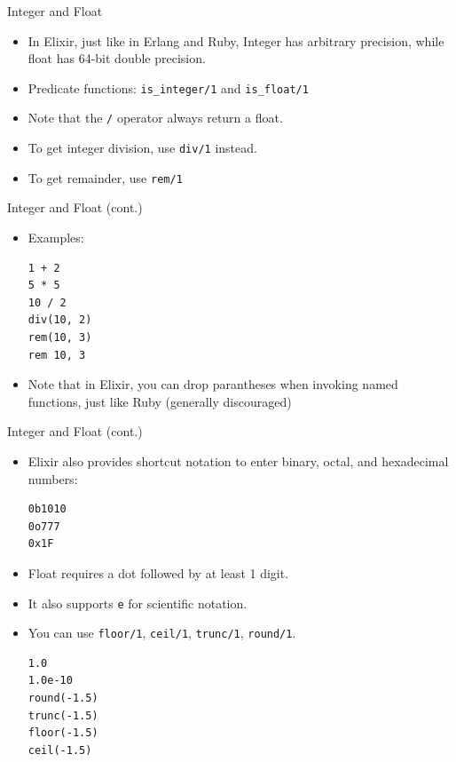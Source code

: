 \documentclass[12pt]{beamer}
\begin{document}
\begin{frame}[fragile]{Integer and Float}
  \begin{itemize}
    \item In Elixir, just like in Erlang and Ruby, Integer has arbitrary precision, while float has 64-bit double precision.
    \item Predicate functions: \texttt{is_integer/1} and \texttt{is_float/1}
    \item Note that the \texttt{/} operator always return a float.
    \item To get integer division, use \texttt{div/1} instead.
    \item To get remainder, use \texttt{rem/1}
  \end{itemize}
\end{frame}

\begin{frame}[fragile]{Integer and Float (cont.)}
  \begin{itemize}
    \item Examples:
          \begin{verbatim}
1 + 2
5 * 5
10 / 2
div(10, 2)
rem(10, 3)
rem 10, 3
  \end{verbatim}
    \item Note that in Elixir, you can drop parantheses when invoking named functions, just like Ruby (generally discouraged)
  \end{itemize}
\end{frame}

\begin{frame}[fragile]{Integer and Float (cont.)}
  \begin{itemize}
    \item Elixir also provides shortcut notation to enter binary, octal, and hexadecimal numbers:
          \begin{verbatim}
0b1010
0o777
0x1F
  \end{verbatim}
    \item Float requires a dot followed by at least 1 digit.
    \item It also supports \texttt{e} for scientific notation.
    \item You can use \texttt{floor/1}, \texttt{ceil/1}, \texttt{trunc/1}, \texttt{round/1}.
          \begin{verbatim}
1.0
1.0e-10
round(-1.5)
trunc(-1.5)
floor(-1.5)
ceil(-1.5)
  \end{verbatim}
  \end{itemize}
\end{frame}
\end{document}
